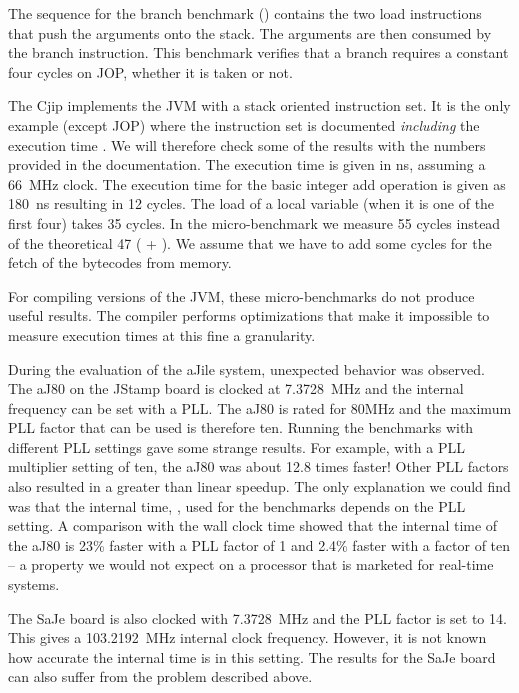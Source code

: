 The sequence for the branch benchmark () contains
the two load instructions that push the arguments onto the stack.
The arguments are then consumed by the branch instruction. This
benchmark verifies that a branch requires a constant four cycles on
JOP, whether it is taken or not.

The Cjip implements the JVM with a stack oriented instruction set.
It is the only example (except JOP) where the instruction set is
documented \emph{including} the execution time \cite{CjipRef}. We
will therefore check some of the results with the numbers provided
in the documentation. The execution time is given in ns, assuming a
66~MHz clock. The execution time for the basic integer add operation
is given as 180~ns resulting in 12 cycles. The load of a local
variable (when it is one of the first four) takes 35 cycles. In the
micro-benchmark we measure 55 cycles instead of the theoretical 47
( + ). We assume that we have to add some
cycles for the fetch of the bytecodes from memory.

For compiling versions of the JVM, these micro-benchmarks do not
produce useful results. The compiler performs optimizations that
make it impossible to measure execution times at this fine a
granularity.

During the evaluation of the aJile system, unexpected behavior was
observed. The aJ80 on the JStamp board is clocked at 7.3728~MHz and
the internal frequency can be set with a PLL. The aJ80 is rated for
80MHz and the maximum PLL factor that can be used is therefore ten.
Running the benchmarks with different PLL settings gave some strange
results. For example, with a PLL multiplier setting of ten, the aJ80
was about 12.8 times faster! Other PLL factors also resulted in a
greater than linear speedup. The only explanation we could find was
that the internal time, , used for
the benchmarks depends on the PLL setting. A comparison with the
wall clock time showed that the internal time of the aJ80 is 23\%
faster with a PLL factor of 1 and 2.4\% faster with a factor of ten
-- a property we would not expect on a processor that is marketed
for real-time systems.

The SaJe board is also clocked with 7.3728~MHz and the PLL factor is
set to 14. This gives a 103.2192~MHz internal clock frequency.
However, it is not known how accurate the internal time is in this
setting. The results for the SaJe board can also suffer from the
problem described above.

